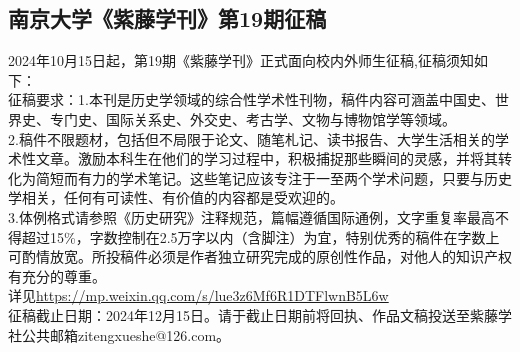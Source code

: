 \documentclass[letterpaper, 12pt]{article}
\begin{document}
\begin{multicols}{2}
\section{南京大学《紫藤学刊》第19期征稿}
2024年10月15日起，第19期《紫藤学刊》正式面向校内外师生征稿,征稿须知如下：\\
征稿要求：1.本刊是历史学领域的综合性学术性刊物，稿件内容可涵盖中国史、世界史、专门史、国际关系史、外交史、考古学、文物与博物馆学等领域。\\
2.稿件不限题材，包括但不局限于论文、随笔札记、读书报告、大学生活相关的学术性文章。激励本科生在他们的学习过程中，积极捕捉那些瞬间的灵感，并将其转化为简短而有力的学术笔记。这些笔记应该专注于一至两个学术问题，只要与历史学相关，任何有可读性、有价值的内容都是受欢迎的。\\
3.体例格式请参照《历史研究》注释规范，篇幅遵循国际通例，文字重复率最高不得超过15\%，字数控制在2.5万字以内（含脚注）为宜，特别优秀的稿件在字数上可酌情放宽。所投稿件必须是作者独立研究完成的原创性作品，对他人的知识产权有充分的尊重。\\
详见\url{https://mp.weixin.qq.com/s/lue3z6Mf6R1DTFlwnB5L6w}\\
征稿截止日期：2024年12月15日。请于截止日期前将回执、作品文稿投送至紫藤学社公共邮箱zitengxueshe@126.com。

\end{multicols}
\end{document}
